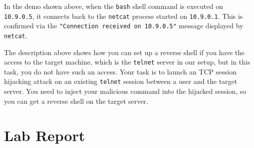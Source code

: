 In the demo shown above, when the \texttt{bash}
shell command is executed on \texttt{10.9.0.5}, it connects back to the \texttt{netcat} process
started on \texttt{10.9.0.1}. This is confirmed via the \texttt{"Connection received on 10.9.0.5"}
message displayed by \texttt{netcat}.


The description above shows how you can set up a reverse shell if you have
the access to the target machine, which is the \texttt{telnet} server in
our setup, but in this task, you do not have such an access. Your task is 
to launch an TCP session hijacking attack on an existing \texttt{telnet}
session between a user and the target server. You need to inject your
malicious command into the hijacked session, so you can get a reverse
shell on the target server. 




\section{Lab Report}

\seedsubmission



